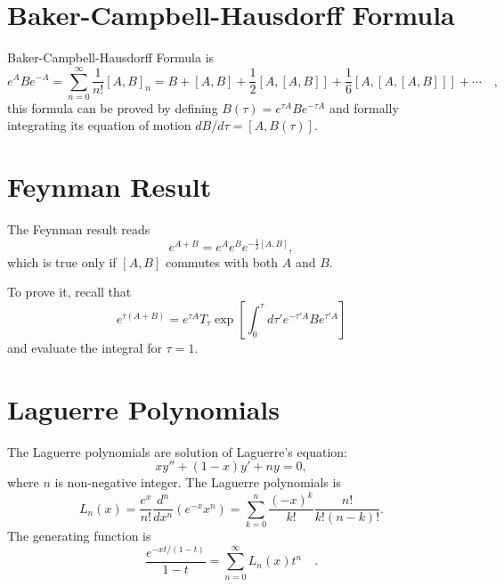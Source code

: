 \documentclass{book}
\numberwithin{equation}{section}
\begin{document}
\section{Baker-Campbell-Hausdorff Formula}
Baker-Campbell-Hausdorff Formula is
\begin{equation}
  e^ABe^{-A}=\sum_{n=0}^\infty\frac{1}{n!}[A,B]_n=
  B+[A,B]+\frac{1}{2}[A,[A,B]]+\frac{1}{6}[A,[A,[A,B]]]+\cdots\quad,
\end{equation}
this formula can be proved by defining $B(\tau)=e^{\tau A}Be^{-\tau A}$
and formally integrating its equation of motion $dB/d\tau=[A,B(\tau)]$.

\section{Feynman Result}
The Feynman result reads
\begin{equation}
  e^{A+B}=e^Ae^Be^{-\frac{1}{2}[A,B]},
\end{equation}
which is true only if $[A,B]$ commutes with both $A$ and $B$.

To prove it, recall that
\begin{equation}
e^{\tau(A+B)}=e^{\tau A}T_\tau\exp\left[
  \int_0^\tau d\tau'e^{-\tau'A}Be^{\tau'A}\right]
\end{equation}
and evaluate the integral for $\tau=1$.

\section{Laguerre Polynomials}
The Laguerre polynomials are solution of Laguerre's equation:
\begin{equation}
  xy''+(1-x)y'+ny=0,
\end{equation}
where $n$ is non-negative integer. The Laguerre polynomials is
\begin{equation}
  L_n(x)=\frac{e^x}{n!}\frac{d^n}{dx^n}(e^{-x}x^n)=
  \sum_{k=0}^n\frac{(-x)^k}{k!}\frac{n!}{k!(n-k)!}.
\end{equation}
The generating function is
\begin{equation}
  \frac{e^{-xt/(1-t)}}{1-t}=\sum_{n=0}^\infty L_n(x)t^n\quad.
\end{equation}
\end{document}
